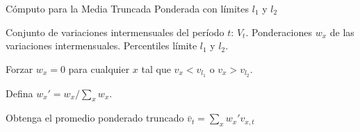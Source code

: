 \begin{algorithm}
	\caption{Cómputo para la Media Truncada Ponderada con límites $l_1$ y $l_2$}
	\label{alg:media_truncada_ponderada}
	\begin{algorithmic}[1]
		\Require Conjunto de variaciones intermensuales del período $t$: $V_t$.
		\Require Ponderaciones $w_x$ de las variaciones intermensuales.
		\Require Percentiles límite $l_1$ y $l_2$.
				
		\State Forzar $w_x = 0$ para cualquier $x$ tal que $v_x < v_{l_1} $ o $v_x > v_{l_2} $.
		
		\State Defina $w_x' = w_x / \sum_{x} w_x $. 
		
		\State Obtenga el promedio ponderado truncado $\bar{v}_t = \sum_{x} w_x' v_{x,t}$
		
	\end{algorithmic}
\end{algorithm}